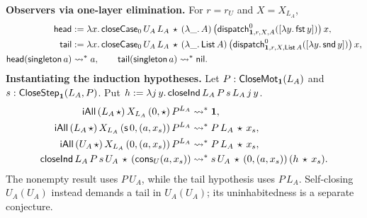 \textbf{Observers via one-layer elimination.}
For $r=r_U$ and $X=X_{L_A}$,
\[
\begin{aligned}
 \mathsf{head}
  &:=\lambda x.\,\mathsf{closeCase}_0\,U_A\,L_A\,\star\,(\lambda\_.\,A)\,
    \bigl(\mathsf{dispatch}^{0}_{\mathbf{1},r,X,A}([\lambda y.\,\mathsf{fst}\,y])\bigr)\,x,\\
 \mathsf{tail}
  &:=\lambda x.\,\mathsf{closeCase}_0\,U_A\,L_A\,\star\,
    (\lambda\_.\,\mathsf{List}\,A)\,
    \bigl(\mathsf{dispatch}^{0}_{\mathbf{1},r,X,\mathsf{List}\,A}
                  ([\lambda y.\,\mathsf{snd}\,y])\bigr)\,x,\\
 \mathsf{head}(\mathsf{singleton}\,a)&\leadsto^*a,\qquad
 \mathsf{tail}(\mathsf{singleton}\,a)\leadsto^*\mathsf{nil}.
\end{aligned}
\]
\textbf{Instantiating the induction hypotheses.}
Let $P:\mathsf{CloseMot}_{\mathbf{1}}(L_A)$ and
$s:\mathsf{CloseStep}_{\mathbf{1}}(L_A,P)$. Put
$h:=\lambda j\,y.\,\mathsf{closeInd}\,L_A\,P\,s\,L_A\,j\,y$.
\[
\begin{aligned}
 \mathsf{iAll}\,(L_A\,\star)\,X_{L_A}\,(0,\star)\,P^{L_A}
    &\leadsto^*\mathbf{1},\\
 \mathsf{iAll}\,(L_A\,\star)\,X_{L_A}\,(\mathsf{s}\,0,(a,x_s))\,P^{L_A}
    &\leadsto^*P\,L_A\,\star\,x_s,\\
 \mathsf{iAll}\,(U_A\,\star)\,X_{L_A}\,(0,(a,x_s))\,P^{L_A}
    &\leadsto^*P\,L_A\,\star\,x_s,\\
 \mathsf{closeInd}\,L_A\,P\,s\,U_A\,\star\,(\mathsf{cons}_U(a,x_s))
    &\leadsto^*s\,U_A\,\star\,(0,(a,x_s))\,(h\,\star\,x_s).
\end{aligned}
\]
The nonempty result uses $P\,U_A$, while the tail hypothesis uses $P\,L_A$.
Self-closing $U_A(U_A)$ instead demands a tail in $U_A(U_A)$; its
uninhabitedness is a separate conjecture.
